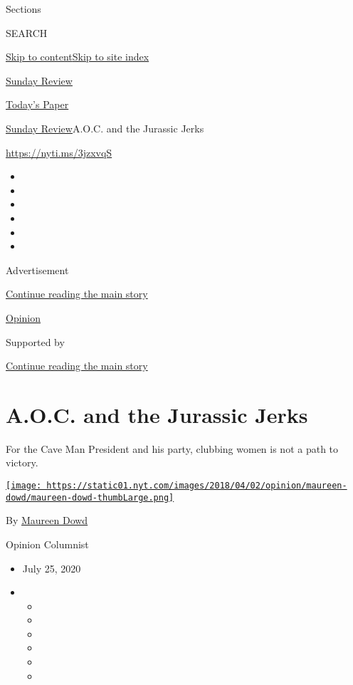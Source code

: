 Sections

SEARCH

\protect\hyperlink{site-content}{Skip to
content}\protect\hyperlink{site-index}{Skip to site index}

\href{https://www.nytimes.com/section/opinion/sunday}{Sunday Review}

\href{https://myaccount.nytimes.com/auth/login?response_type=cookie\&client_id=vi}{}

\href{https://www.nytimes.com/section/todayspaper}{Today's Paper}

\href{/section/opinion/sunday}{Sunday Review}\textbar{}A.O.C. and the
Jurassic Jerks

\url{https://nyti.ms/3jzxvqS}

\begin{itemize}
\item
\item
\item
\item
\item
\item
\end{itemize}

Advertisement

\protect\hyperlink{after-top}{Continue reading the main story}

\href{/section/opinion}{Opinion}

Supported by

\protect\hyperlink{after-sponsor}{Continue reading the main story}

\hypertarget{aoc-and-the-jurassic-jerks}{%
\section{A.O.C. and the Jurassic
Jerks}\label{aoc-and-the-jurassic-jerks}}

For the Cave Man President and his party, clubbing women is not a path
to victory.

\href{https://www.nytimes.com/by/maureen-dowd}{\texttt{[image: https://static01.nyt.com/images/2018/04/02/opinion/maureen-dowd/maureen-dowd-thumbLarge.png]}}

By \href{https://www.nytimes.com/by/maureen-dowd}{Maureen Dowd}

Opinion Columnist

\begin{itemize}
\item
  July 25, 2020
\item
  \begin{itemize}
  \item
  \item
  \item
  \item
  \item
  \item
  \end{itemize}
\end{itemize}

